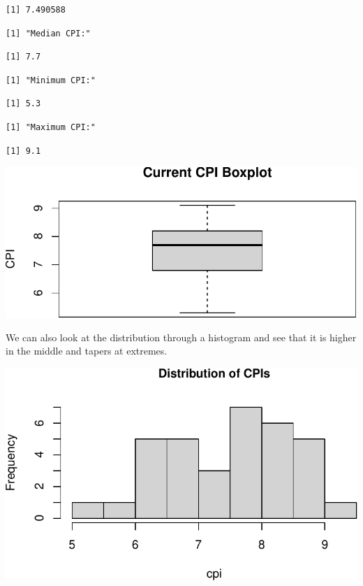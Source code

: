 \documentclass[
  letterpaper,
  DIV=11,
  numbers=noendperiod]{scrartcl}
\begin{document}
\begin{verbatim}
[1] 7.490588
\end{verbatim}

\begin{verbatim}
[1] "Median CPI:"
\end{verbatim}

\begin{verbatim}
[1] 7.7
\end{verbatim}

\begin{verbatim}
[1] "Minimum CPI:"
\end{verbatim}

\begin{verbatim}
[1] 5.3
\end{verbatim}

\begin{verbatim}
[1] "Maximum CPI:"
\end{verbatim}

\begin{verbatim}
[1] 9.1
\end{verbatim}

\includegraphics{Question1_files/figure-pdf/unnamed-chunk-6-1.pdf}

We can also look at the distribution through a histogram and see that it
is higher in the middle and tapers at extremes.

\includegraphics{Question1_files/figure-pdf/unnamed-chunk-7-1.pdf}
\end{document}
